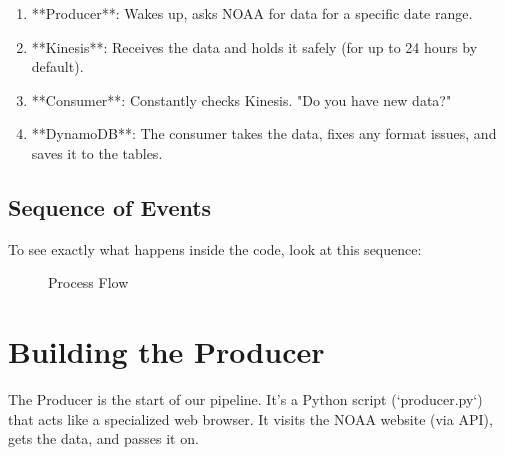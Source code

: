 \documentclass[12pt, a4paper]{article}
\begin{document}
\begin{enumerate}
    \item **Producer**: Wakes up, asks NOAA for data for a specific date range.
    \item **Kinesis**: Receives the data and holds it safely (for up to 24 hours by default).
    \item **Consumer**: Constantly checks Kinesis. "Do you have new data?"
    \item **DynamoDB**: The consumer takes the data, fixes any format issues, and saves it to the tables.
\end{enumerate}

\subsection{Sequence of Events}
To see exactly what happens inside the code, look at this sequence:

\begin{figure}[H]
\centering
{}
\caption{Process Flow}
\end{figure}

\newpage

\section{Building the Producer}

The Producer is the start of our pipeline. It's a Python script (`producer.py`) that acts like a specialized web browser. It visits the NOAA website (via API), gets the data, and passes it on.
\end{document}
